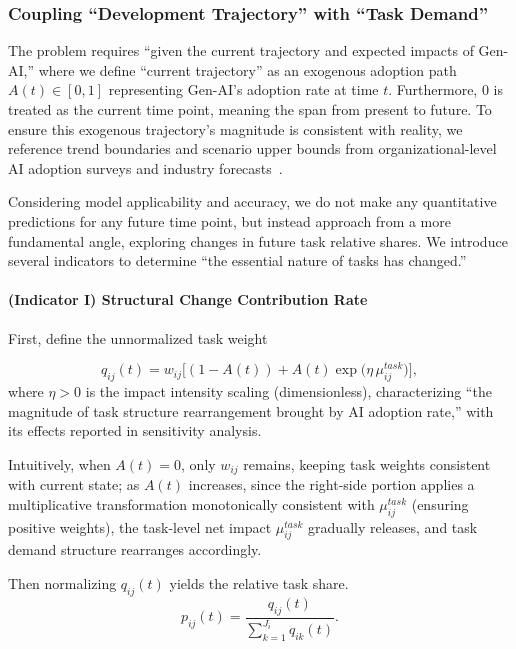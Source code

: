 \subsubsection{Coupling ``Development Trajectory'' with ``Task Demand''}

The problem requires ``given the current trajectory and expected impacts of Gen-AI,'' where we define ``current trajectory'' as an exogenous adoption path $A(t)\in[0,1]$ representing Gen-AI's adoption rate at time $t$. Furthermore, 0 is treated as the current time point, meaning the span from present to future. To ensure this exogenous trajectory's magnitude is consistent with reality, we reference trend boundaries and scenario upper bounds from organizational-level AI adoption surveys and industry forecasts~\cite{mckinsey2024stateai,mckinsey2025stateai,gartner2023genai}.

Considering model applicability and accuracy, we do not make any quantitative predictions for any future time point, but instead approach from a more fundamental angle, exploring changes in future task relative shares. We introduce several indicators to determine ``the essential nature of tasks has changed.''
\paragraph{(Indicator I) Structural Change Contribution Rate}
First, define the unnormalized task weight

\begin{equation}
    q_{ij}(t)=w_{ij}\Big[(1-A(t))+A(t)\exp\big(\eta\,\mu^{task}_{ij}\big)\Big],
\end{equation}
where $\eta>0$ is the impact intensity scaling (dimensionless), characterizing ``the magnitude of task structure rearrangement brought by AI adoption rate,'' with its effects reported in sensitivity analysis.

Intuitively, when $A(t)=0$, only $w_{ij}$ remains, keeping task weights consistent with current state; as $A(t)$ increases, since the right-side portion applies a multiplicative transformation monotonically consistent with $\mu^{task}_{ij}$ (ensuring positive weights), the task-level net impact $\mu^{task}_{ij}$ gradually releases, and task demand structure rearranges accordingly.


Then normalizing $q_{ij}(t)$ yields the relative task share.
\begin{equation}
    p_{ij}(t)=\frac{q_{ij}(t)}{\sum_{k=1}^{J_i} q_{ik}(t)}.
\end{equation}


